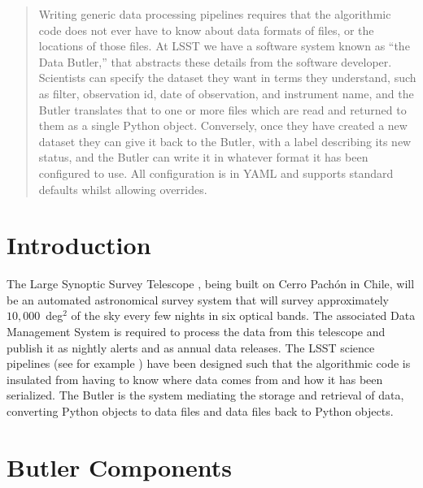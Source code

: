 \documentclass[11pt,twoside]{article}
\begin{document}
\begin{abstract}
  Writing generic data processing pipelines requires that the algorithmic code does not ever have to know about data formats of files, or the locations of those files.
  At LSST we have a software system known as ``the Data Butler,'' that abstracts these details from the software developer.
  Scientists can specify the dataset they want in terms they understand, such as filter, observation id, date of observation, and instrument name, and the Butler translates that to one or more files which are read and returned to them as a single Python object.
  Conversely, once they have created a new dataset they can give it back to the Butler, with a label describing its new status, and the Butler can write it in whatever format it has been configured to use.
  All configuration is in YAML and supports standard defaults whilst allowing overrides.
\end{abstract}

\section{Introduction}

The Large Synoptic Survey Telescope \citep{2008arXiv0805.2366I}, being built on Cerro Pach\'{o}n in Chile, will be an automated astronomical survey system that will survey approximately $10,000$~deg$^2$ of the sky every few nights in six optical bands.
The associated Data Management System \citep{2017ASPC..512..279J} is required to process the data from this telescope and publish it as nightly alerts and as annual data releases.
The LSST science pipelines (see for example \citet{2018PASJ...70S...5B}) have been designed such that the algorithmic code is insulated from having to know where data comes from and how it has been serialized.
The Butler is the system mediating the storage and retrieval of data, converting Python objects to data files and data files back to Python objects.

\section{Butler Components}
\end{document}
